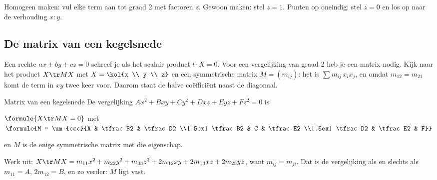 \begin{werkwijze}
Homogeen maken: vul elke term aan tot graad 2 met factoren $z$. Gewoon maken: stel $z = 1$. Punten op oneindig: stel $z = 0$ en los op naar de verhouding $x : y$.
\end{werkwijze}


\begin{oefeningen}
\end{oefeningen}

\subsection{De matrix van een kegelsnede}

Een rechte $ax + by + cz = 0$ schreef je als het scalair product $l \cdot X = 0$. Voor een vergelijking van graad 2 heb je een matrix nodig. Kijk naar het product $X\tr MX$ met $X = \kol{x \\ y \\ z}$ en een symmetrische matrix $M = (m_{ij})$: het is $\sum m_{ij}\,x_ix_j$, en omdat $m_{12} = m_{21}$ komt de term in $xy$ twee keer voor. Daarom staat de halve coëfficiënt naast de diagonaal.

\begin{theorie}
\begin{stelling}{Matrix van een kegelsnede}
De vergelijking $Ax^2 + Bxy + Cy^2 + Dxz + Eyz + Fz^2 = 0$ is

\vspace{1mm}
\qquad $\formule{X\tr MX = 0}$ \qquad met \qquad $\formule{M = \um{ccc}{A & \tfrac B2 & \tfrac D2 \\[.5ex] \tfrac B2 & C & \tfrac E2 \\[.5ex] \tfrac D2 & \tfrac E2 & F}}$

\vspace{1mm}
en $M$ is de enige symmetrische matrix met die eigenschap.
\end{stelling}

\begin{bewijs}
Werk uit: $X\tr MX = m_{11}x^2 + m_{22}y^2 + m_{33}z^2 + 2m_{12}xy + 2m_{13}xz + 2m_{23}yz$, want $m_{ij} = m_{ji}$. Dat is de vergelijking als en slechts als $m_{11} = A$, $2m_{12} = B$, en zo verder: $M$ ligt vast.
\end{bewijs}
\end{theorie}

